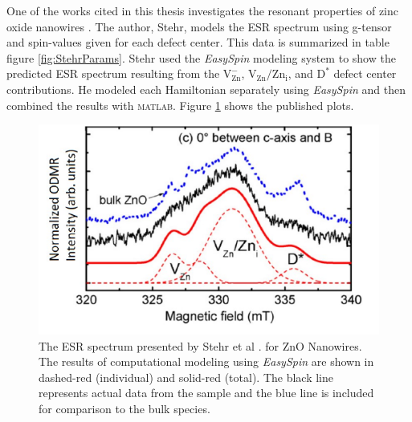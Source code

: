 \documentclass[oneside, noacknowlegments]{BYUPhys}
\begin{document}
One of the works cited in this thesis investigates the resonant properties of zinc oxide nanowires \cite{RefWorks:doc:58929128e4b0228a292928a7}. The author, Stehr, models the ESR spectrum using g-tensor and spin-values given for each defect center. This data is summarized in table figure \ref{fig:StehrParams}. Stehr used the \textit{EasySpin} modeling system to show the predicted ESR spectrum resulting from the $\text{V}_{\text{Zn}}^{-}$, $\text{V}_{\text{Zn}}/\text{Zn}_{\text{i}}$, and $\text{D}^{*}$ defect center contributions. He modeled each Hamiltonian separately using \textit{EasySpin} and then combined the results with \textsc{matlab}. Figure \ref{fig:StehrPlots} shows the published plots.

\begin{figure}
    \centerline{\includegraphics{stehr_fig}}
    \caption[ESR Spectrum Presented by Stehr et al.]{\label{fig:StehrPlots}
     The ESR spectrum presented by Stehr et al \cite{RefWorks:doc:58929128e4b0228a292928a7}. for ZnO Nanowires. The results of computational modeling using \textit{EasySpin} are shown in dashed-red (individual) and solid-red (total). The black line represents actual data from the sample and the blue line is included for comparison to the bulk species.}
 \end{figure}
\end{document}
